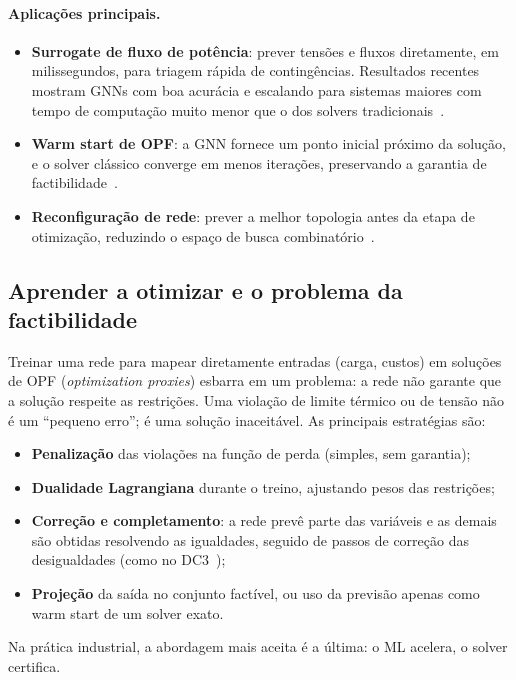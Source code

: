 \documentclass[11pt,a4paper]{article}
\begin{document}
\paragraph{Aplicações principais.}
\begin{itemize}
  \item \textbf{Surrogate de fluxo de potência}: prever tensões e fluxos
    diretamente, em milissegundos, para triagem rápida de contingências.
    Resultados recentes mostram GNNs com boa acurácia e escalando para
    sistemas maiores com tempo de computação muito menor que o dos solvers
    tradicionais~\cite{gnnpf}.
  \item \textbf{Warm start de OPF}: a GNN fornece um ponto inicial próximo da
    solução, e o solver clássico converge em menos iterações, preservando a
    garantia de factibilidade~\cite{gnnopfinit}.
  \item \textbf{Reconfiguração de rede}: prever a melhor topologia antes da
    etapa de otimização, reduzindo o espaço de busca
    combinatório~\cite{gnnreconf}.
\end{itemize}

\subsection{Aprender a otimizar e o problema da factibilidade}

Treinar uma rede para mapear diretamente entradas (carga, custos) em
soluções de OPF (\textit{optimization proxies}) esbarra em um problema: a rede
não garante que a solução respeite as restrições. Uma violação de limite
térmico ou de tensão não é um ``pequeno erro''; é uma solução inaceitável. As
principais estratégias são:
\begin{itemize}
  \item \textbf{Penalização} das violações na função de perda (simples, sem
    garantia);
  \item \textbf{Dualidade Lagrangiana} durante o treino, ajustando pesos das
    restrições;
  \item \textbf{Correção e completamento}: a rede prevê parte das variáveis e
    as demais são obtidas resolvendo as igualdades, seguido de passos de
    correção das desigualdades (como no DC3~\cite{dc3});
  \item \textbf{Projeção} da saída no conjunto factível, ou uso da previsão
    apenas como warm start de um solver exato.
\end{itemize}
Na prática industrial, a abordagem mais aceita é a última: o ML acelera, o
solver certifica.
\end{document}
